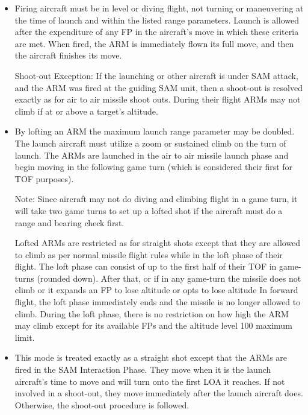 \begin{itemize}

    \item{} Firing aircraft must be in level or diving flight, not turning or maneuvering at the time of launch and within the listed range parameters. Launch is allowed after the expenditure of any FP in the aircraft's move in which these criteria are met. When fired, the ARM is immediately flown its full move, and then the aircraft finishes its move.

    Shoot-out Exception: If the launching or other aircraft is under SAM attack, and the ARM was fired at the guiding SAM unit, then a shoot-out is resolved exactly as for air to air missile shoot outs. During their flight ARMs may not climb if at or above a target's altitude.

    \item{} By lofting an ARM the maximum launch range parameter may be doubled. The launch aircraft must utilize a zoom or sustained climb on the turn of launch. The ARMs are launched in the air to air missile launch phase and begin moving in the following game turn (which is considered their first for TOF purposes).

    Note: Since aircraft may not do diving and climbing flight in a game turn, it will take two game turns to set up a lofted shot if the aircraft must do a range and bearing check first.

    Lofted ARMs are restricted as for straight shots except that they are allowed to climb as per normal missile flight rules while in the loft phase of their flight. The loft phase can consist of up to the first half of their TOF in game-turns (rounded down). After that, or if in any game-turn the missile does not climb or it expands an FP to lose altitude or opts to lose altitude In forward flight, the loft phase immediately ends and the missile is no longer allowed to climb. During the loft phase, there is no restriction on how high the ARM may climb except for its available FPs and the altitude level 100 maximum limit.

    \item{} This mode is treated exactly as a straight shot except that the ARMs are fired in the SAM Interaction Phase. They move when it is the launch aircraft's time to move and will turn onto the first LOA it reaches. If not involved in a shoot-out, they move immediately after the launch aircraft does. Otherwise, the shoot-out procedure is followed.

\end{itemize}

